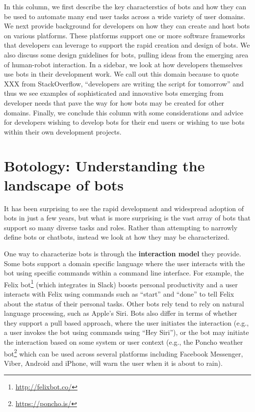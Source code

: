 \documentclass{sig-alternate}
\begin{document}
In this column, we first describe the key characterstics of bots and how they can be used to automate many end user tasks across a wide variety of user domains.  
We next provide background for developers on how they can create and host bots on various platforms. These platforms support one or more software frameworks that developers can leverage to support the rapid creation and design of bots. We also discuss some design guidelines for bots, pulling ideas from the emerging area of human-robot interaction. 
In a sidebar, we look at how developers themselves use bots in their development work.  We call out this domain because to quote XXX from StackOverflow, ``developers are writing the script for tomorrow'' and thus we see examples of sophisticated and innovative bots emerging from developer needs that pave the way for how bots may be created for other domains.
Finally, we conclude this column with some considerations and advice for developers wishing to develop bots for their end users or wishing to use bots within their own development projects.   

  

\section{Botology: Understanding the landscape of bots}




It has been surprising to see the rapid development and widespread adoption of bots in just a few years, but what is more surprising is the vast array of bots that support so many diverse tasks and roles.  
Rather than attempting to narrowly define bots or chatbots, instead we look at how they may be characterized. 

One way to characterize bots is through the \textbf{interaction model} they provide. 
Some bots support a domain specific language where the user interacts with the bot using specific commands within a command line interface.  For example, the Felix bot\footnote{\url{http://felixbot.co/}} (which integrates in Slack) boosts personal productivity and a user interacts with Felix using commands such as ``start'' and ``done'' to tell Felix about the status of their personal tasks.   
Other bots rely tend to rely on natural language processing, such as Apple's Siri.
Bots also differ in terms of whether they support a pull based approach, where the user initiates the interaction (e.g., a user invokes the bot using commands using ``Hey Siri''), or the bot may initiate the interaction based on some system or user context (e.g., the Poncho weather bot\footnote{\url{https://poncho.is/}} which can be used across several platforms including Facebook Messenger, Viber, Android and iPhone, will warn the user when it is about to rain). 
\end{document}
